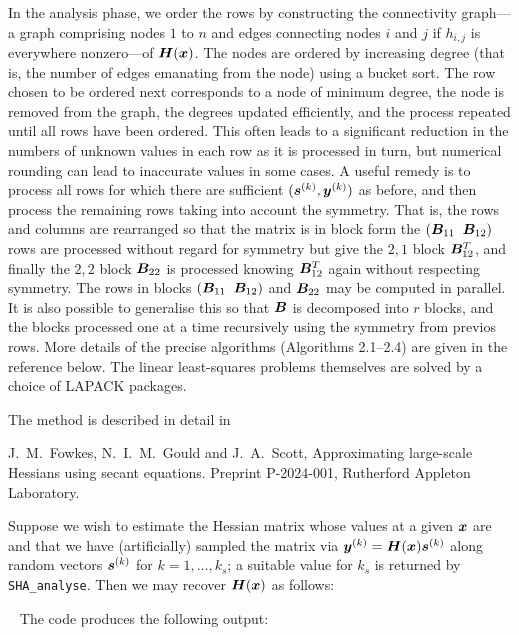 \documentclass{galahad}
\newcommand{\packagename}{SHA}
\begin{document}
In the analysis phase, we order the rows by constructing the connectivity
graph---a graph comprising nodes $1$ to $n$ and edges connecting
nodes $i$ and $j$ if $h_{i,j}$ is everywhere nonzero---of ${\bm{H}}({\bm{x}})$.
The nodes are ordered by increasing degree (that is, the number of edges
emanating from the node) using a bucket sort. The row chosen to be
ordered next corresponds to a node of minimum degree, the node
is removed from the graph, the degrees updated efficiently, and the
process repeated until all rows have been ordered. This often leads
to a significant reduction in the numbers of unknown values in each
row as it is processed in turn, but numerical rounding can lead to
inaccurate values in some cases. A useful remedy is to process all
rows for which there are sufficient $({\bm{s}}^{(k)}, {\bm{y}}^{(k)})$ as before,
and then process the remaining rows taking into account the symmetry.
That is, the rows and columns are rearranged so that the matrix
is in block form
the $( {\bm{B}}_{11} \;\; {\bm{B}}_{12})$ rows are processed without regard
for symmetry but give the $2,1$ block ${\bm{B}}^T_{12}$, and finally
the $2,2$ block ${\bm{B}}_{22}$ is processed knowing ${\bm{B}}^T_{12}$
again without respecting symmetry. The rows in blocks
$( {\bm{B}}_{11} \;\; {\bm{B}}_{12})$ and ${\bm{B}}_{22}$ may be computed in parallel.
It is also possible to generalise this so that ${\bm{B}}$ is decomposed into
$r$ blocks, and the blocks processed one at a time recursively using the
symmetry from previos rows.
More details of the precise algorithms (Algorithms 2.1--2.4)
are given in the reference below. The linear least-squares problems 
themselves are solved by a choice of LAPACK packages.

\vspace*{1mm}

\galreference
\vspace*{1mm}

\noindent
The method is described in detail in
\vspace*{1mm}

\noindent

J.\ M.\ Fowkes, N.\ I.\ M.\ Gould and J.\ A.\ Scott,
Approximating large-scale Hessians using secant equations.
Preprint P-2024-001, Rutherford Appleton Laboratory.


\galexamples
Suppose we wish to estimate the Hessian matrix whose values at
a given ${\bm{x}}$ are
and that we have (artificially) sampled the matrix via
${\bm{y}}^{(k)} = {\bm{H}}({\bm{x}}) {\bm{s}}^{(k)}$ along random vectors
${\bm{s}}^{(k)}$ for $k = 1, \ldots, k_s$; a suitable value for $k_s$ is
returned by {\tt \packagename\_analyse}. Then we may recover ${\bm{H}}({\bm{x}})$
as follows:

{\tt \small
\VerbatimInput{\packageexample}
}
\noindent
The code produces the following output:
{\tt \small
\VerbatimInput{\packageresults}
}
\noindent
\end{document}

